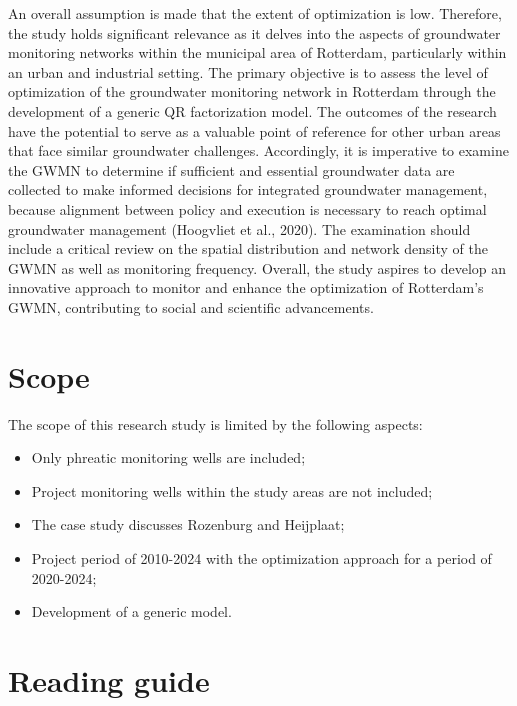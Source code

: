 An overall assumption is made that the extent of optimization is low. Therefore, the study holds significant relevance as it delves into the aspects of groundwater monitoring networks within the municipal area of Rotterdam, particularly within an urban and industrial setting. The primary objective is to assess the level of optimization of the groundwater monitoring network in Rotterdam through the development of a generic QR factorization model. The outcomes of the research have the potential to serve as a valuable point of reference for other urban areas that face similar groundwater challenges. Accordingly, it is imperative to examine the GWMN to determine if sufficient and essential groundwater data are collected to make informed decisions for integrated groundwater management, because alignment between policy and execution is necessary to reach optimal groundwater management (Hoogvliet et al., 2020). The examination should include a critical review on the spatial distribution and network density of the GWMN as well as monitoring frequency. Overall, the study aspires to develop an innovative approach to monitor and enhance the optimization of Rotterdam’s GWMN, contributing to social and scientific advancements. 

\section{Scope}

The scope of this research study is limited by the following aspects: 
\begin{itemize}
    \item Only phreatic monitoring wells are included;
    \item Project monitoring wells within the study areas are not included; 
    \item The case study discusses Rozenburg and Heijplaat;
    \item Project period of 2010-2024 with the optimization approach for a period of 2020-2024;
    \item Development of a generic model.
\end{itemize}

\section{Reading guide}

